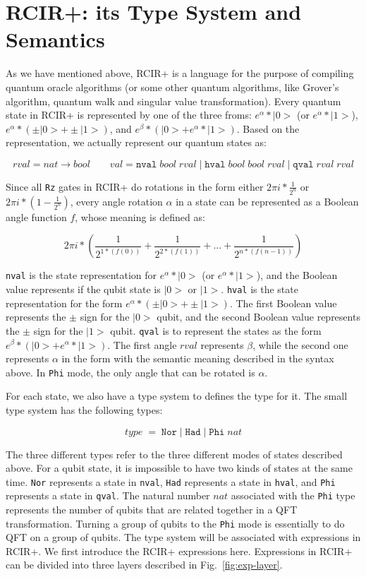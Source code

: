 \section{RCIR+: its Type System and Semantics}
\label{sec:semantics}

As we have mentioned above, RCIR+ is a language for the purpose of compiling quantum oracle algorithms (or some other quantum algorithms, like Grover's algorithm, quantum walk and singular value transformation). Every quantum state in RCIR+ is represented by one of the three froms: $e^{\alpha}*|0>$ (or $e^{\alpha}*|1>$), $e^{\alpha}*(\pm|0>+\pm|1>)$, and $e^{\beta}*(|0> + e^{\alpha}*|1>)$. Based on the representation, we actually represent our quantum states as:

{
\[
rval = nat \to bool\qquad val = \texttt{nval}\; bool\;rval \;|\;\texttt{hval}\;bool\;bool\;rval\;|\;\texttt{qval}\;rval\;rval 
\]
}

Since all \texttt{Rz} gates in RCIR+ do rotations in the form either $2\pi i *\frac{1}{2^n}$ or $2\pi i *(1-\frac{1}{2^n})$, every angle rotation $\alpha$ in a state can be represented as a Boolean angle function $f$, whose meaning is defined as:

{
\[
 2\pi i * (\frac{1}{2^{1*(f(0))}} + \frac{1}{2^{2*(f(1))}} + ... + \frac{1}{2^{n*(f(n-1))}})
\]
}

\texttt{nval} is the state representation for $e^{\alpha}*|0>$ (or $e^{\alpha}*|1>$), and the Boolean value represents if the qubit state is $|0>$ or $|1>$. \texttt{hval} is the state representation for the form $e^{\alpha}*(\pm|0>+\pm|1>)$. The first Boolean value represents the $\pm$ sign for the $|0>$ qubit, and the second Boolean value represents the $\pm$ sign for the $|1>$ qubit. \texttt{qval} is to represent the states as the form $e^{\beta} * (|0> + e^{\alpha}*|1>)$. The first angle $rval$ represents $\beta$, while the second one represents $\alpha$ in the form with the semantic meaning described in the syntax above. In \texttt{Phi} mode, the only angle that can be rotated is $\alpha$.

For each state, we also have a type system to defines the type for it. The small type system has the following types:

\[
 type \;= \;\texttt{Nor}\; | \;\texttt{Had}\; |\; \texttt{Phi}\;nat
\]
 
The three different types refer to the three different modes of states described above. For a qubit state, it is impossible to have two kinds of states at the same time. \texttt{Nor} represents a state in \texttt{nval}, \texttt{Had} represents a state in \texttt{hval}, and \texttt{Phi} represents a state in \texttt{qval}. The natural number $nat$ associated with the \texttt{Phi} type represents the number of qubits that are related together in a QFT transformation. Turning a group of qubits to the \texttt{Phi} mode is essentially to do QFT on a group of qubits.  The type system will be associated with expressions in RCIR+. We first introduce the RCIR+ expressions here. Expressions in RCIR+ can be divided into three layers described in Fig.~\ref{fig:exp-layer}.

